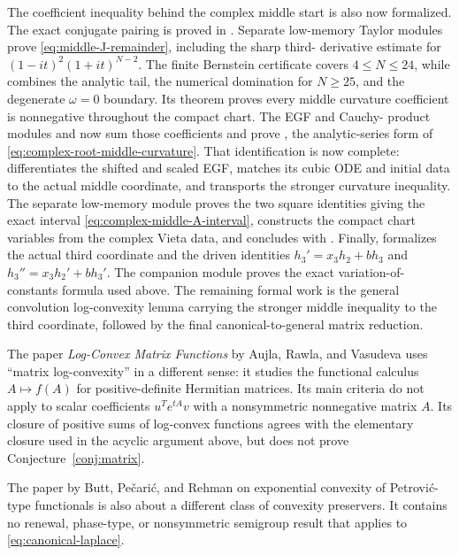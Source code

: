 \documentclass[11pt]{article}
\theoremstyle{remark}
\begin{document}
The coefficient inequality behind the complex middle start is also now
formalized.  The exact conjugate pairing is proved in
.  Separate low-memory Taylor
modules prove \eqref{eq:middle-J-remainder}, including the sharp third-
derivative estimate for $(1-it)^2(1+it)^{N-2}$.  The finite Bernstein
certificate covers $4\leq N\leq24$, while
 combines the analytic tail,
the numerical domination for $N\geq25$, and the degenerate $\omega=0$
boundary.  Its theorem
 proves every middle curvature
coefficient is nonnegative throughout the compact chart.  The EGF and Cauchy-
product modules  and
 now sum those coefficients
and prove , the analytic-series form of
\eqref{eq:complex-root-middle-curvature}.  That identification is now complete:
 differentiates the shifted and
scaled EGF, matches its cubic ODE and initial data to the actual middle
coordinate, and transports the stronger curvature inequality.  The separate
low-memory module  proves the
two square identities giving the exact interval
\eqref{eq:complex-middle-A-interval}, constructs the compact chart variables
from the complex Vieta data, and concludes with
.  Finally,
 formalizes the actual third coordinate and
the driven identities $h_3'=x_3h_2+bh_3$ and
$h_3''=x_3h_2'+bh_3'$.  The companion module
 proves the exact variation-of-
constants formula used above.  The remaining formal work is the general
convolution log-convexity lemma carrying the stronger middle inequality to the
third coordinate, followed by the final canonical-to-general matrix reduction.

The paper \emph{Log-Convex Matrix Functions} by Aujla, Rawla, and Vasudeva uses
``matrix log-convexity'' in a different sense: it studies the functional calculus
\(A\mapsto f(A)\) for positive-definite Hermitian matrices.  Its main criteria do
not apply to scalar coefficients \(u^Te^{tA}v\) with a nonsymmetric nonnegative
matrix \(A\).  Its closure of positive sums of log-convex functions agrees with
the elementary closure used in the acyclic argument above, but does not prove
Conjecture~\ref{conj:matrix}.

The paper by Butt, Pe\v{c}ari\'c, and Rehman on exponential convexity of
Petrovi\'c-type functionals is also about a different class of convexity
preservers.  It contains no renewal, phase-type, or nonsymmetric semigroup
result that applies to \eqref{eq:canonical-laplace}.
\end{document}
